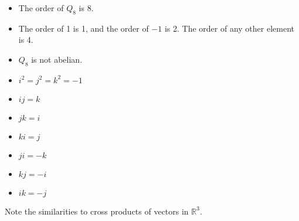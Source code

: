 \documentclass{article}
\begin{document}
\begin{itemize}
\begin{itemize}
 \item The order of $Q_8$ is $8$.
 \item The order of 1 is 1, and the order of $-1$ is 2.  The order of any other element is 4.
 \item $Q_8$ is not abelian.
 \item $i^2 = j^2 = k^2 = -1$
 \item $ij = k$
 \item $jk = i$
 \item $ki = j$
 \item $ji = -k$
 \item $kj = -i$
 \item $ik = -j$
 \end{itemize}
 Note the similarities to cross products of vectors in $\mathbb{R}^3$.

\end{itemize}
\end{document}
